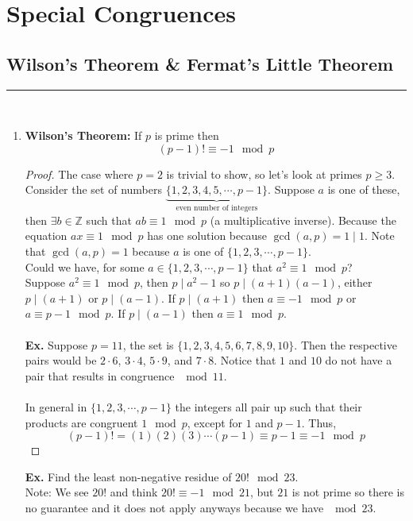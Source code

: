 \documentclass[class=article, crop=false]{standalone}
\def\integers{{\mathbb Z}}
\begin{document}
    
\section{Special Congruences}

\subsection{Wilson's Theorem \& Fermat's Little Theorem}
\rule{\textwidth}{1pt}\\
\begin{enumerate}[1.]
	\item \textbf{Wilson's Theorem:}
	If $p$ is prime then $$(p-1)!\equiv -1\mod p$$
	\begin{proof}
		The case where $p=2$ is trivial to show, so let's look at primes $p\geq 3$.
		Consider the set of numbers $\underbrace{\{1,2,3,4,5,\cdots,p-1\}}_{\text{even number of integers}}$.
		Suppose $a$ is one of these, then $\exists b\in\integers$ such that $ab\equiv 1\mod p$ (a multiplicative inverse).
		Because the equation $ax\equiv 1\mod p$ has one solution because $\gcd(a,p)=1\mid1$.
		Note that $\gcd(a,p)=1$ because $a$ is one of $\{1,2,3,\cdots,p-1\}$.\\
		Could we have, for some $a\in\{1,2,3,\cdots, p-1\}$ that $a^2\equiv 1\mod p$?\\
		Suppose $a^2\equiv 1\mod p$, then $p\mid a^2-1$ so $p\mid (a+1)(a-1)$, either
		$p\mid (a+1)$ or $p\mid (a-1)$.
		If $p\mid (a+1)$ then $a\equiv -1\mod p$ or $a\equiv p-1\mod p$. If $p\mid(a-1)$
		then $a\equiv 1\mod p$.\\\\
		\textbf{Ex.} Suppose $p=11$, the set is $\{1,2,3,4,5,6,7,8,9,10\}$. Then the respective
		pairs would be $2\cdot6$, $3\cdot4$, $5\cdot9$, and $7\cdot8$. Notice that $1$ and $10$
		do not have a pair that results in congruence $\mod 11$.\\\\
		In general in $\{1,2,3,\cdots,p-1\}$ the integers all pair up such that their products
		are congruent $1\mod p$, except for $1$ and $p-1$. Thus,
		$$(p-1)!=(1)(2)(3)\cdots(p-1)\equiv p-1\equiv -1\mod p$$
	\end{proof}
	\noindent\textbf{Ex.} Find the least non-negative residue of $20!\mod 23$.\\
	Note: We see $20!$ and think $20!\equiv -1\mod 21$, but $21$ is not prime so there is
	no guarantee and it does not apply anyways because we have $\mod 23$.\\

\end{enumerate}
\end{document}
